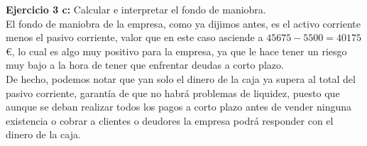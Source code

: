 \documentclass[11pt]{article}
\theoremstyle{plain}
\theoremstyle{definition}
\begin{document}
\textbf{Ejercicio 3 c:} Calcular e interpretar el fondo de maniobra.\\

El fondo de maniobra de la empresa, como ya dijimos antes, es el
activo corriente menos el pasivo corriente, valor que en este caso
asciende a $45675 - 5500 = 40175$ €, lo cual es algo muy positivo para
la empresa, ya que le hace tener un riesgo muy bajo a la hora de tener
que enfrentar deudas a corto plazo.\\

De hecho, podemos notar que yan solo el dinero de la caja ya supera al 
total del pasivo corriente, garantía de que no habrá problemas de liquidez,
puesto que aunque se deban realizar todos los pagos a corto plazo antes de 
vender ninguna existencia o cobrar a clientes o deudores la empresa
podrá responder con el dinero de la caja.
\end{document}
